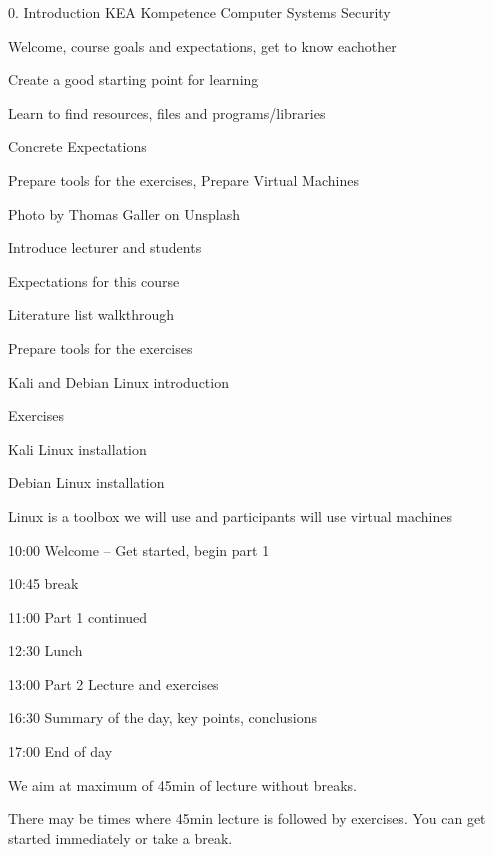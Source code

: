 \documentclass[Screen16to9,17pt]{foils}
\begin{document}
\mytitlepage
{0. Introduction}
{KEA Kompetence Computer Systems Security \the\year}

\hlkprofiluk




\begin{list2}
\item Welcome, course goals and expectations, get to know eachother
\item Create a good starting point for learning
\item Learn to find resources, files and programs/libraries
\item Concrete Expectations
\item Prepare tools for the exercises, Prepare Virtual Machines
\end{list2}

  Photo by Thomas Galler on Unsplash



\begin{list2}
\item Introduce lecturer and students
\item Expectations for this course
\item Literature list walkthrough
\item Prepare tools for the exercises
\item Kali and Debian Linux introduction
\end{list2}

Exercises
\begin{list2}
\item Kali Linux installation
\item Debian Linux installation
\end{list2}
Linux is a toolbox we will use and participants will use virtual machines



\begin{list2}
\item 10:00 Welcome -- Get started, begin part 1
\item 10:45 break
\item 11:00 Part 1 continued
\item 12:30 Lunch
\item 13:00 Part 2 Lecture and exercises
\item 16:30 Summary of the day, key points, conclusions
\item 17:00 End of day
\vskip 5mm
\item We aim at maximum of 45min of lecture without breaks.
\item There may be times where 45min lecture is followed by exercises. You can get started immediately or take a break.
\end{list2}
\end{document}
